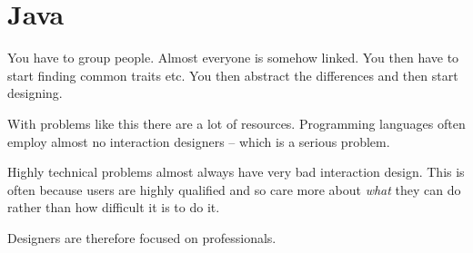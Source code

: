 \documentclass[10pt, a4paper]{article}
\begin{document}
\section{Java}

You have to group people. Almost everyone is somehow linked.
You then have to start finding common traits etc. You then abstract the differences and then start
designing.

With problems like this there are a lot of resources. Programming languages often employ almost no
interaction designers -- which is a serious problem.

Highly technical problems almost always have very bad interaction design. This is often because users are highly
qualified and so care more about \textit{what} they can do rather than how difficult it is to do it.

Designers are therefore focused on professionals. 
\end{document}
